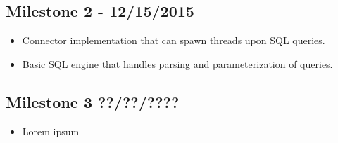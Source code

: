 \documentclass[letterpaper]{article}
\begin{document}
  \subsection{Milestone 2 - 12/15/2015}
  \begin{itemize}
   \item Connector implementation that can spawn threads upon SQL queries.
   \item Basic SQL engine that handles parsing and parameterization of queries.
  \end{itemize}
  \subsection{Milestone 3 ??/??/????}
  \begin{itemize}
   \item Lorem ipsum
  \end{itemize}
\end{document}

